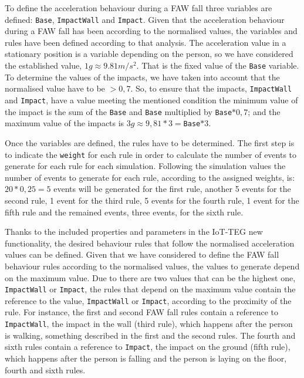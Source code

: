 \documentclass[journal]{IEEEtran}
\begin{document}
To define the acceleration behaviour during a FAW fall three variables are defined: \texttt{\small{Base}}, 
\texttt{\small{ImpactWall}} and \texttt{\small{Impact}}. Given that the acceleration behaviour during a FAW fall has
been according to the normalised values, the variables and rules have been defined according to 
that analysis. The acceleration value in a stationary position is a variable depending on the person, so 
we have considered the established value, $1g\approx9.81m/s^{2}$. That is the fixed value of the 
\texttt{\small{Base}} variable. To determine the values of the impacts, we have taken into account that the 
normalised value have to be $> 0,7$. So, to ensure that the impacts, \texttt{\small{ImpactWall}} and 
\texttt{\small{Impact}}, have a value meeting the mentioned condition the minimum value of the impact is the 
sum of the \texttt{\small{Base}} and \texttt{\small{Base}} multiplied by \texttt{\small{Base}}$*0,7$; and the maximum value of the
impacts is $3g\approx9,81*3=$\texttt{\small{Base}}$*3$.

Once the variables are defined, the rules have to be determined. The first step is to indicate the 
\texttt{\small{weight}} for each rule in order to calculate the number of events to generate for each rule for 
each simulation. Following the simulation values the number of events to generate for each rule, according 
to the assigned weights, is: $20 * 0,25 = 5$ events will be generated for the first rule, another 5 events 
for the second rule, 1 event for the third rule, 5 events for the fourth rule, 1 event for the fifth
rule and the remained events, three events, for the sixth rule. 

Thanks to the included properties and parameters in the IoT-TEG new functionality, the desired behaviour rules that
follow the normalised acceleration values can be defined. Given that we have considered to define the FAW fall behaviour
rules according to the normalised values, the values to generate depend on the maximum value. Due to there are two 
values that can be the highest one, \texttt{\small{ImpactWall}} or \texttt{\small{Impact}}, the rules that depend on the maximum 
value contain the reference to the value, \texttt{\small{ImpactWall}} or \texttt{\small{Impact}}, according to the proximity
of the rule. For instance, the first and second FAW fall rules contain a reference to \texttt{\small{ImpactWall}}, the impact 
in the wall (third rule), which happens after the person is walking, something described in the first and the second rules.
The fourth and sixth rules contain a reference to \texttt{\small{Impact}}, the impact on the ground (fifth rule), which happens
after the person is falling and the person is laying on the floor, fourth and sixth rules.
\end{document}
